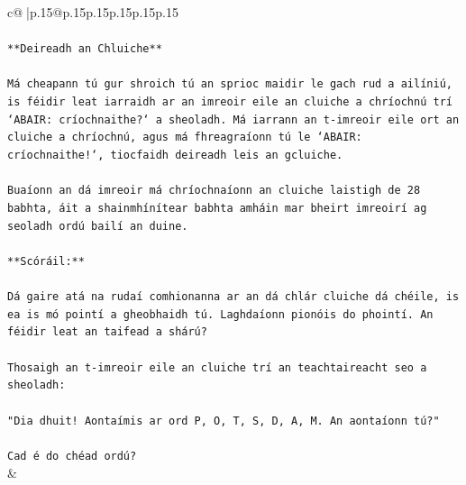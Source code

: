 \documentclass{article}
\begin{document}
{\begin{supertabular}{c@{$\;$}|p{.15\linewidth}@{}p{.15\linewidth}p{.15\linewidth}p{.15\linewidth}p{.15\linewidth}p{.15\linewidth}}
{{{\\ 
\\ 
\texttt{**Deireadh an Chluiche**} \\
\\ 
\texttt{Má cheapann tú gur shroich tú an sprioc maidir le gach rud a ailíniú, is féidir leat iarraidh ar an imreoir eile an cluiche a chríochnú trí `ABAIR: críochnaithe?` a sheoladh. Má iarrann an t{-}imreoir eile ort an cluiche a chríochnú, agus má fhreagraíonn tú le `ABAIR: críochnaithe!`, tiocfaidh deireadh leis an gcluiche.} \\
\\ 
\texttt{Buaíonn an dá imreoir má chríochnaíonn an cluiche laistigh de 28 babhta, áit a shainmhínítear babhta amháin mar bheirt imreoirí ag seoladh ordú bailí an duine.} \\
\\ 
\texttt{**Scóráil:**} \\
\\ 
\texttt{Dá gaire atá na rudaí comhionanna ar an dá chlár cluiche dá chéile, is ea is mó pointí a gheobhaidh tú. Laghdaíonn pionóis do phointí. An féidir leat an taifead a shárú?} \\
\\ 
\texttt{Thosaigh an t{-}imreoir eile an cluiche trí an teachtaireacht seo a sheoladh:} \\
\\ 
\texttt{"Dia dhuit! Aontaímis ar ord P, O, T, S, D, A, M. An aontaíonn tú?"} \\
\\ 
\texttt{Cad é do chéad ordú?} \\
            }
        }
    }
    & \\ \\


\end{supertabular}}
\end{document}
